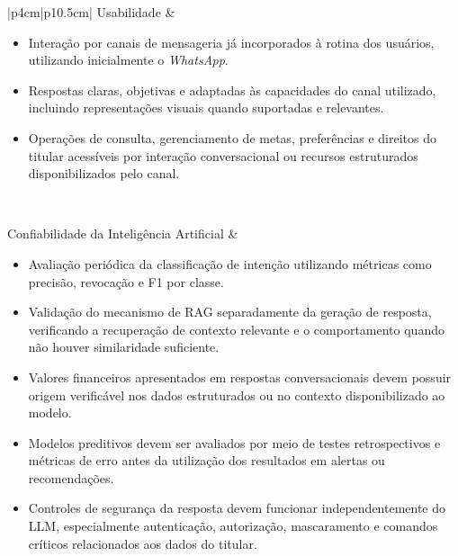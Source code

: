 {\begin{longtable}{|p{4cm}|p{10.5cm}|}
Usabilidade &
\begin{minipage}[t]{\linewidth}
\begin{itemize}[noitemsep,topsep=2pt,leftmargin=*]
    \item Interação por canais de mensageria já incorporados à rotina dos usuários, utilizando inicialmente o \textit{WhatsApp}.
    \item Respostas claras, objetivas e adaptadas às capacidades do canal utilizado, incluindo representações visuais quando suportadas e relevantes.
    \item Operações de consulta, gerenciamento de metas, preferências e direitos do titular acessíveis por interação conversacional ou recursos estruturados disponibilizados pelo canal.
\end{itemize}
\end{minipage} \\ \hline

Confiabilidade da Inteligência Artificial &
\begin{minipage}[t]{\linewidth}
\begin{itemize}[noitemsep,topsep=2pt,leftmargin=*]
    \item Avaliação periódica da classificação de intenção utilizando métricas como precisão, revocação e F1 por classe.
    \item Validação do mecanismo de RAG separadamente da geração de resposta, verificando a recuperação de contexto relevante e o comportamento quando não houver similaridade suficiente.
    \item Valores financeiros apresentados em respostas conversacionais devem possuir origem verificável nos dados estruturados ou no contexto disponibilizado ao modelo.
    \item Modelos preditivos devem ser avaliados por meio de testes retrospectivos e métricas de erro antes da utilização dos resultados em alertas ou recomendações.
    \item Controles de segurança da resposta devem funcionar independentemente do LLM, especialmente autenticação, autorização, mascaramento e comandos críticos relacionados aos dados do titular.
\end{itemize}
\end{minipage} \\ \hline


\end{longtable}}
